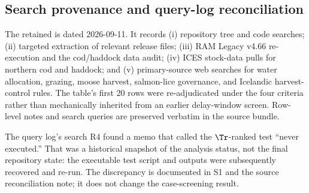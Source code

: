 

\subsection{Search provenance and query-log reconciliation}

The retained \texttt{} is dated 2026-09-11. It records (i) repository tree and code searches; (ii) targeted extraction of relevant release files; (iii) RAM Legacy v4.66 re-execution and the cod/haddock data audit; (iv) ICES stock-data pulls for northern cod and haddock; and (v) primary-source web searches for water allocation, grazing, moose harvest, salmon-lice governance, and Icelandic harvest-control rules. The table's first 20 rows were re-adjudicated under the four criteria rather than mechanically inherited from an earlier delay-window screen. Row-level notes and search queries are preserved verbatim in the source bundle.

The query log's search R4 found a memo that called the \(\Tr\)-ranked test ``never executed.'' That was a historical snapshot of the analysis status, not the final repository state: the executable test script and outputs were subsequently recovered and re-run. The discrepancy is documented in S1 and the source reconciliation note; it does not change the case-screening result.

